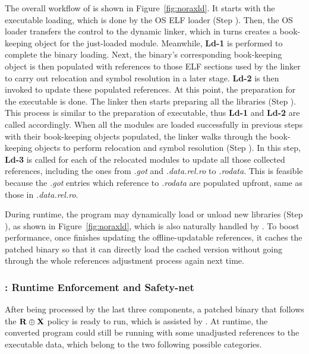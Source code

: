 
The overall workflow of \NLoader is shown in Figure~\ref{fig:noraxld}. 
It starts with the executable loading, which is done by the OS ELF loader (Step  ). 
Then, the OS loader transfers the control to the dynamic linker, which in turns creates a book-keeping object for the just-loaded module. Meanwhile, \textbf{Ld-1} is performed to complete the binary loading. Next, the binary's corresponding book-keeping object is then populated with references to those ELF sections used by the linker to carry out relocation and symbol resolution in a later stage. \textbf{Ld-2} is then invoked to update these populated references. 
At this point, the preparation for the executable is done. The linker then starts preparing all the libraries (Step  ). This process is similar to the preparation of executable, thus \textbf{Ld-1} and \textbf{Ld-2} are called accordingly.  
%
When all the modules are loaded successfully in previous steps with their book-keeping objects populated, the linker walks through the book-keeping objects to perform relocation and symbol resolution (Step  ). In this step, \textbf{Ld-3} is called for each of the relocated modules to update all those collected references, including the ones from \textit{.got} and \textit{.data.rel.ro} to \textit{.rodata}. This is feasible because the \textit{.got} entries which reference to \textit{.rodata} are populated upfront, same as those in \textit{.data.rel.ro}. 

During runtime, the program may dynamically load or unload new libraries (Step  ), as shown in Figure~\ref{fig:noraxld}, which is also naturally handled by \NLoader. To boost performance, once \NLoader finishes updating the offline-updatable references, it caches the patched binary so that it can directly load the cached version without going through the whole references adjustment process again next time.

\subsubsection{\NMonitor: Runtime Enforcement and Safety-net}
After being processed by the last three \NORAX components, a patched binary that follows the $\bf{R}\oplus\bf{X}$ policy is ready to run, which is assisted by \NMonitor.
At runtime, the converted program could still be running with some unadjusted references to the executable data, which belong to the two following possible categories. 

